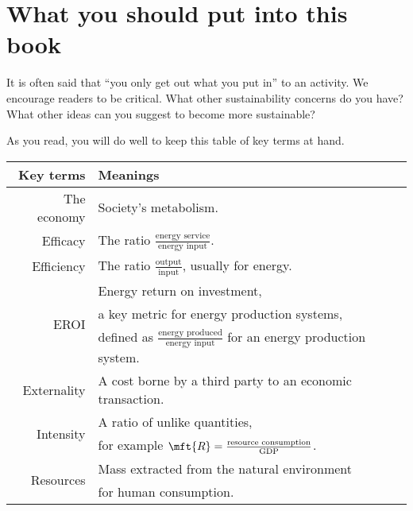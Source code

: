 {%
\section*{What you should put into this book} 

It is often said that ``you only get out what you put in'' to an activity.
We encourage readers to be critical.
What other sustainability concerns do you have?
What other ideas can you suggest to become more sustainable?

As you read, you will do well to keep this table of key terms at hand.

\begin{table}[h!]
\centering
\begin{tabular}{r l}
\toprule
Key terms             & Meanings      \\ 
\midrule
The economy           & Society's metabolism. \\
%
Efficacy              & The ratio $\frac{\text{energy service}}{\text{energy input}}$. \\
%
Efficiency            & The ratio $\frac{\text{output}}{\text{input}}$, usually for energy.  \\
%
\multirow{3}{*}{EROI} & Energy return on investment, \\
                      & a key metric for energy production systems, \\
                      & defined as $\frac{\text{energy produced}}{\text{energy input}}$ for an energy production system. \\
%
Externality           & A cost borne by a third party to an economic transaction. \\
%
\multirow{2}{*}{Intensity}  & A ratio of unlike quantities, \\
                            & for example $\mft{R} = \frac{\text{resource consumption}}{\text{GDP}}$. \\
%
\multirow{2}{*}{Resources}  & Mass extracted from the natural environment \\
                            & for human consumption. \\
\bottomrule
\end{tabular}
\label{tab:key_terms}
\end{table}



}

